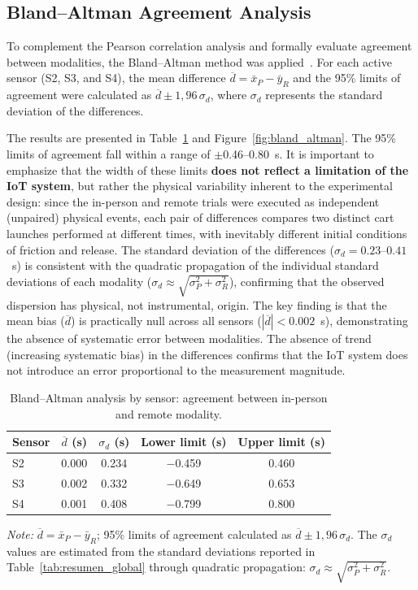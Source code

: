 \documentclass[sensors,article,submit,pdftex]{Definitions/mdpi}
\begin{document}
\subsection{Bland--Altman Agreement Analysis}

To complement the Pearson correlation analysis and
formally evaluate agreement between modalities, the
Bland--Altman method was applied~\cite{bland1986}. For each
active sensor (S2, S3, and S4), the mean difference
$\overline{d} = \bar{x}_P - \bar{y}_R$ and the
95\% limits of agreement were calculated as
$\overline{d} \pm 1{,}96\,\sigma_d$, where $\sigma_d$
represents the standard deviation of the differences.

The results are presented in Table~\ref{tab:bland_altman} and Figure~\ref{fig:bland_altman}.
The 95\% limits of agreement fall within a range of
$\pm$0.46--0.80~s. It is important to emphasize that the width of these
limits \textbf{does not reflect a limitation of the IoT system}, but rather
the physical variability inherent to the experimental design: since
the in-person and remote trials were executed as independent (unpaired)
physical events, each pair of differences compares two
distinct cart launches performed at different times,
with inevitably different initial conditions of friction and release.
The standard deviation of the differences
($\sigma_d = 0.23$--$0.41$~s) is consistent with the quadratic
propagation of the individual standard deviations of each modality
($\sigma_d \approx \sqrt{\sigma_P^2 + \sigma_R^2}$), confirming
that the observed dispersion has physical, not instrumental, origin.
The key finding is that the mean bias ($\overline{d}$) is practically
null across all sensors ($|\overline{d}| < 0.002$~s), demonstrating
the absence of systematic error between modalities.
The absence of trend (increasing systematic bias) in
the differences confirms that the IoT system does not introduce
an error proportional to the measurement magnitude.

\begin{table}[H]
\caption{Bland--Altman analysis by sensor:
agreement between in-person and remote modality.}
\label{tab:bland_altman}
\centering
\small
\begin{tabular}{lcccc}
\toprule
\textbf{Sensor} &
\textbf{$\overline{d}$ (s)} &
\textbf{$\sigma_d$ (s)} &
\textbf{Lower limit (s)} &
\textbf{Upper limit (s)} \\
\midrule
S2 & 0.000 & 0.234 & $-$0.459 & 0.460 \\
S3 & 0.002 & 0.332 & $-$0.649 & 0.653 \\
S4 & 0.001 & 0.408 & $-$0.799 & 0.800 \\
\bottomrule
\end{tabular}
\par\smallskip
{\footnotesize\noindent\textit{Note:}
$\overline{d} = \bar{x}_P - \bar{y}_R$;
95\% limits of agreement calculated as
$\overline{d} \pm 1{,}96\,\sigma_d$.
The $\sigma_d$ values are estimated from the
standard deviations reported in Table~\ref{tab:resumen_global}
through quadratic propagation:
$\sigma_d \approx \sqrt{\sigma_P^2 + \sigma_R^2}$.}
\end{table}
\end{document}
